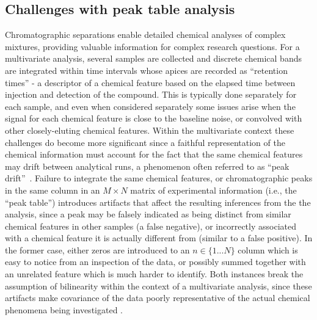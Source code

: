 \documentclass[preprint,12pt]{elsarticle}
\begin{document}
\subsection{Challenges with peak table analysis}
Chromatographic separations enable detailed chemical analyses of complex mixtures, providing valuable information for complex research questions. For a multivariate analysis, several samples are collected and discrete chemical bands are integrated within time intervals whose apices are recorded as ``retention times'' - a descriptor of a chemical feature based on the elapsed time between injection and detection of the compound. This is typically done separately for each sample, and even when considered separately some issues arise when the signal for each chemical feature is close to the baseline noise, or convolved with other closely-eluting chemical features. Within the multivariate context these challenges do become more significant since a faithful representation of the chemical information must account for the fact that the same chemical features may drift between analytical runs, a phenomenon often referred to as ``peak drift''~\cite{christensen2005chromatographic}. Failure to integrate the same chemical features, or chromatographic peaks in the same column in an $M \times N$ matrix of experimental information (i.e., the ``peak table'') introduces artifacts that affect the resulting inferences from the the analysis, since a peak may be falsely indicated as being distinct from similar chemical features in other samples (a false negative), or incorrectly associated with a chemical feature it is actually different from (similar to a false positive). In the former case, either zeros are introduced to an $n \in \{1...N\}$ column which is easy to notice from an inspection of the data, or possibly summed together with an unrelated feature which is much harder to identify. Both instances break the assumption of bilinearity within the context of a multivariate analysis, since these artifacts make covariance of the data poorly representative of the actual chemical phenomena being investigated \cite{armstrong2023parafac2}.
\end{document}

